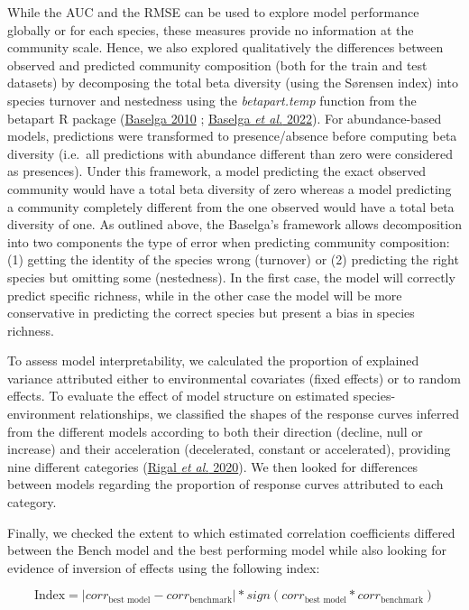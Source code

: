 \documentclass[9pt,biorxiv,doublespacing,lineno,endfloat]{lapreprint}
\begin{document}
While the AUC and the RMSE can be used to explore model performance
globally or for each species, these measures provide no information at
the community scale. Hence, we also explored qualitatively the
differences between observed and predicted community composition (both
for the train and test datasets) by decomposing the total beta diversity
(using the Sørensen index) into species turnover and nestedness using
the \emph{betapart.temp} function from the betapart R package
(\protect\hyperlink{ref-Baselga_2010}{Baselga 2010} ;
\protect\hyperlink{ref-Baselga_2022}{Baselga \emph{et al.} 2022}). For
abundance-based models, predictions were transformed to presence/absence
before computing beta diversity (i.e.~all predictions with abundance
different than zero were considered as presences). Under this framework,
a model predicting the exact observed community would have a total beta
diversity of zero whereas a model predicting a community completely
different from the one observed would have a total beta diversity of
one. As outlined above, the Baselga's framework allows decomposition
into two components the type of error when predicting community
composition: (1) getting the identity of the species wrong (turnover) or
(2) predicting the right species but omitting some (nestedness). In the
first case, the model will correctly predict specific richness, while in
the other case the model will be more conservative in predicting the
correct species but present a bias in species richness.

To assess model interpretability, we calculated the proportion of
explained variance attributed either to environmental covariates (fixed
effects) or to random effects. To evaluate the effect of model structure
on estimated species-environment relationships, we classified the shapes
of the response curves inferred from the different models according to
both their direction (decline, null or increase) and their acceleration
(decelerated, constant or accelerated), providing nine different
categories (\protect\hyperlink{ref-Rigal_2020}{Rigal \emph{et al.}
2020}). We then looked for differences between models regarding the
proportion of response curves attributed to each category.

Finally, we checked the extent to which estimated correlation
coefficients differed between the Bench model and the best performing
model while also looking for evidence of inversion of effects using the
following index:

\[\text{Index} = |corr_{\text{best model}} - corr_{\text{benchmark}}| * sign(corr_{\text{best model}} * corr_{\text{benchmark}})\]
\end{document}
